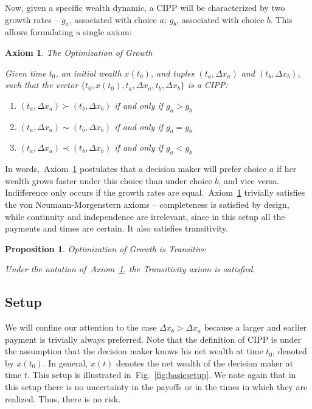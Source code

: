 \documentclass[11pt]{article}
\newtheorem{proposition}{Proposition}
\newtheorem{axiom}{Axiom}
\newcommand{\Aref}[1]{Axiom~\ref{ax:#1}}
\newcommand{\fref}[1]{Fig.~\ref{fig:#1}}
\newcommand{\Dx}{\Delta x}
\numberwithin{equation}{section}
\begin{document}
Now, given a specific wealth dynamic, a CIPP will be characterized by two growth rates -- $g_a$, associated with choice $a$; $g_b$, associated with choice $b$. This allows formulating a single axiom:

\begin{axiom}{The Optimization of Growth}

Given time $t_0$, an initial wealth $x\left(t_0\right)$, and tuples $\left(t_a,\Dx_a\right)$ and $\left(t_b,\Dx_b\right)$, such that the vector $\{t_0,x\left(t_0\right),t_a,\Dx_a,t_b,\Dx_b\}$ is a CIPP:

\begin{enumerate}
\item $\left(t_a,\Dx_a\right) \succ \left(t_b,\Dx_b\right)$ if and only if $g_a > g_b$
\item $\left(t_a,\Dx_a\right) \sim \left(t_b,\Dx_b\right)$ if and only if $g_a = g_b$
\item $\left(t_a,\Dx_a\right) \prec \left(t_b,\Dx_b\right)$ if and only if $g_a < g_b$
\end{enumerate}
\label{ax:ax1}
\end{axiom}

In words,~\Aref{ax1} postulates that a decision maker will prefer choice $a$ if her wealth grows faster under this choice than under choice $b$, and vice versa. Indifference only occurs if the growth rates are equal.~\Aref{ax1} trivially satisfies the von Neumann-Morgenstern axioms -- completeness is satisfied by design, while continuity and independence are irrelevant, since in this setup all the payments and times are certain. It also satisfies transitivity.

\begin{proposition}{Optimization of Growth is Transitive}

Under the notation of~\Aref{ax1}, the Transitivity axiom is satisfied.
\label{prop:trans}
\end{proposition}

\subsection{Setup}

We will confine our attention to the case $\Dx_b>\Dx_a$ because a larger and earlier payment is trivially always preferred. Note that the definition of CIPP is under the assumption that the decision maker knows his net wealth at time $t_0$, denoted by $x\left(t_0\right)$. In general, $x\left(t\right)$ denotes the net wealth of the decision maker at time $t$. This setup is illustrated in~\fref{basicsetup}. We note again that in this setup there is no uncertainty in the payoffs or in the times in which they are realized. Thus, there is no risk.
\end{document}
